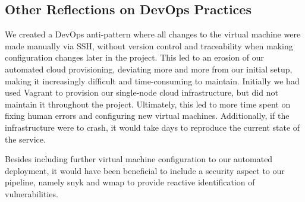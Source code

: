\subsection{Other Reflections on DevOps Practices}



We created a DevOps anti-pattern where all changes to the virtual machine were made manually via SSH, without version control and traceability when making configuration changes later in the project. 
This led to an erosion of our automated cloud provisioning, deviating more and more from our initial setup, making it increasingly difficult and time-consuming to maintain. Initially we had used Vagrant to provision our single-node cloud infrastructure, but did not maintain it throughout the project.
Ultimately, this led to more time spent on fixing human errors and configuring new virtual machines. 
Additionally, if the infrastructure were to crash, it would take days to reproduce the current state of the service.

Besides including further virtual machine configuration to our automated deployment, it would have been beneficial to include a security aspect to our pipeline, namely snyk and wmap to provide reactive identification of vulnerabilities. 


